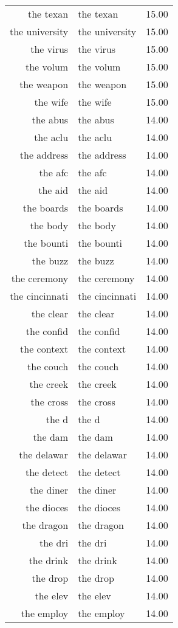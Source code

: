 \begin{table}[ht]
\begin{tabular}{rlr}
  the texan & the texan & 15.00 \\ 
  the university & the university & 15.00 \\ 
  the virus & the virus & 15.00 \\ 
  the volum & the volum & 15.00 \\ 
  the weapon & the weapon & 15.00 \\ 
  the wife & the wife & 15.00 \\ 
  the abus & the abus & 14.00 \\ 
  the aclu & the aclu & 14.00 \\ 
  the address & the address & 14.00 \\ 
  the afc & the afc & 14.00 \\ 
  the aid & the aid & 14.00 \\ 
  the boards & the boards & 14.00 \\ 
  the body & the body & 14.00 \\ 
  the bounti & the bounti & 14.00 \\ 
  the buzz & the buzz & 14.00 \\ 
  the ceremony & the ceremony & 14.00 \\ 
  the cincinnati & the cincinnati & 14.00 \\ 
  the clear & the clear & 14.00 \\ 
  the confid & the confid & 14.00 \\ 
  the context & the context & 14.00 \\ 
  the couch & the couch & 14.00 \\ 
  the creek & the creek & 14.00 \\ 
  the cross & the cross & 14.00 \\ 
  the d & the d & 14.00 \\ 
  the dam & the dam & 14.00 \\ 
  the delawar & the delawar & 14.00 \\ 
  the detect & the detect & 14.00 \\ 
  the diner & the diner & 14.00 \\ 
  the dioces & the dioces & 14.00 \\ 
  the dragon & the dragon & 14.00 \\ 
  the dri & the dri & 14.00 \\ 
  the drink & the drink & 14.00 \\ 
  the drop & the drop & 14.00 \\ 
  the elev & the elev & 14.00 \\ 
  the employ & the employ & 14.00 \\ 

\end{tabular}
\end{table}
